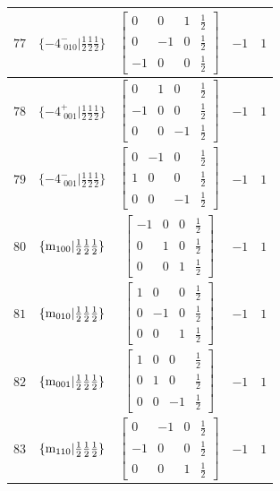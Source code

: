 \documentclass[fleqn,8pt]{jsarticle}
\begin{document}
\begin{longtable}{ccccc}
$ 77 $ & $ \{-4^{-}_{\,\,010}|\frac{1}{2} \frac{1}{2} \frac{1}{2}\} $ & $ \begin{bmatrix} 0 & 0 & 1 & \frac{1}{2} \\ 0 & -1 & 0 & \frac{1}{2} \\ -1 & 0 & 0 & \frac{1}{2} \end{bmatrix} $ & $ -1 $ & $ 1 $ \\ \hline
$ 78 $ & $ \{-4^{+}_{\,\,001}|\frac{1}{2} \frac{1}{2} \frac{1}{2}\} $ & $ \begin{bmatrix} 0 & 1 & 0 & \frac{1}{2} \\ -1 & 0 & 0 & \frac{1}{2} \\ 0 & 0 & -1 & \frac{1}{2} \end{bmatrix} $ & $ -1 $ & $ 1 $ \\ \hline
$ 79 $ & $ \{-4^{-}_{\,\,001}|\frac{1}{2} \frac{1}{2} \frac{1}{2}\} $ & $ \begin{bmatrix} 0 & -1 & 0 & \frac{1}{2} \\ 1 & 0 & 0 & \frac{1}{2} \\ 0 & 0 & -1 & \frac{1}{2} \end{bmatrix} $ & $ -1 $ & $ 1 $ \\ \hline
$ 80 $ & $ \{{\rm m}_{100}|\frac{1}{2} \frac{1}{2} \frac{1}{2}\} $ & $ \begin{bmatrix} -1 & 0 & 0 & \frac{1}{2} \\ 0 & 1 & 0 & \frac{1}{2} \\ 0 & 0 & 1 & \frac{1}{2} \end{bmatrix} $ & $ -1 $ & $ 1 $ \\ \hline
$ 81 $ & $ \{{\rm m}_{010}|\frac{1}{2} \frac{1}{2} \frac{1}{2}\} $ & $ \begin{bmatrix} 1 & 0 & 0 & \frac{1}{2} \\ 0 & -1 & 0 & \frac{1}{2} \\ 0 & 0 & 1 & \frac{1}{2} \end{bmatrix} $ & $ -1 $ & $ 1 $ \\ \hline
$ 82 $ & $ \{{\rm m}_{001}|\frac{1}{2} \frac{1}{2} \frac{1}{2}\} $ & $ \begin{bmatrix} 1 & 0 & 0 & \frac{1}{2} \\ 0 & 1 & 0 & \frac{1}{2} \\ 0 & 0 & -1 & \frac{1}{2} \end{bmatrix} $ & $ -1 $ & $ 1 $ \\ \hline
$ 83 $ & $ \{{\rm m}_{110}|\frac{1}{2} \frac{1}{2} \frac{1}{2}\} $ & $ \begin{bmatrix} 0 & -1 & 0 & \frac{1}{2} \\ -1 & 0 & 0 & \frac{1}{2} \\ 0 & 0 & 1 & \frac{1}{2} \end{bmatrix} $ & $ -1 $ & $ 1 $ \\ \hline

\end{longtable}
\end{document}
